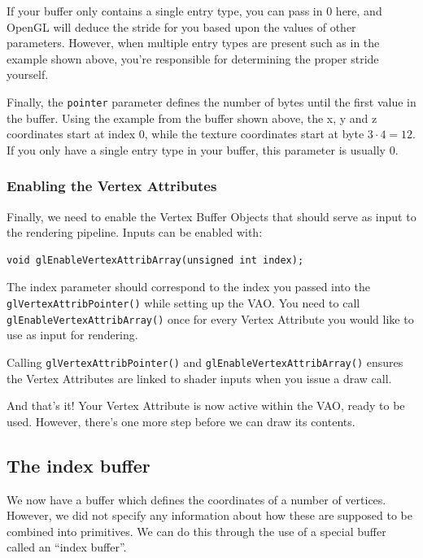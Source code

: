 If your buffer only contains a single entry type, you can pass in 0 here, and OpenGL will deduce the stride for you based upon the values of other parameters. However, when multiple entry types are present such as in the example shown above, you're responsible for determining the proper stride yourself.

Finally, the \texttt{pointer} parameter defines the number of bytes until the first value in the buffer. Using the example from the buffer shown above, the x, y and z coordinates start at index 0, while the texture coordinates start at byte $3 \cdot 4 = 12$. If you only have a single entry type in your buffer, this parameter is usually 0.

\subsubsection{Enabling the Vertex Attributes}

Finally, we need to enable the Vertex Buffer Objects that should serve as input to the rendering pipeline. Inputs can be enabled with: 

\begin{verbatim}
void glEnableVertexAttribArray(unsigned int index);
\end{verbatim}

The index parameter should correspond to the index you passed into the \texttt{glVertexAttribPointer()} while setting up the VAO. You need to call \texttt{glEnableVertexAttribArray()} once for every Vertex Attribute you would like to use as input for rendering.

Calling \texttt{glVertexAttribPointer()} and \texttt{glEnableVertexAttribArray()} ensures the Vertex Attributes are linked to shader inputs when you issue a draw call. 

And that's it! Your Vertex Attribute is now active within the VAO, ready to be used. However, there's one more step before we can draw its contents.

\subsection{The index buffer}

We now have a buffer which defines the coordinates of a number of vertices. However, we did not specify any information about how these are supposed to be combined into primitives. We can do this through the use of a special buffer called an ``index buffer''. 

